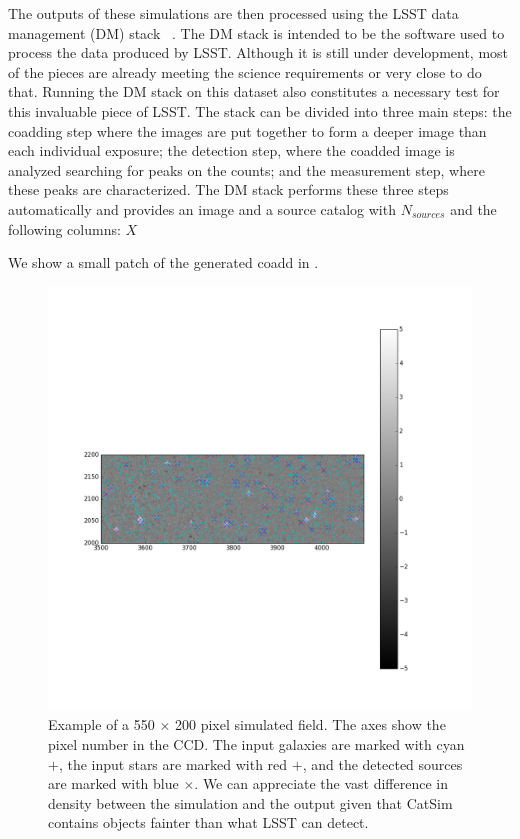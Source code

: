 \documentclass[\docopts]{\docclass}
\begin{document}
The outputs of these simulations are then processed using the LSST data management (DM) stack~\citep{Overview,ScienceBook,WhitePaper}  . The DM stack is intended to be the software used to process the data produced by LSST. Although it is still under development, most of the pieces are already meeting the science requirements or very close to do that. Running the DM stack on this dataset also constitutes a necessary test for this invaluable piece of LSST. The stack can be divided into three main steps: the coadding step where the images are put together to form a deeper image than each individual exposure; the detection step, where the coadded image is analyzed searching for peaks on the counts; and the measurement step, where these peaks are characterized. The DM stack performs these three steps automatically and provides an image and a source catalog with $N_{sources}$ and the following columns: $X$  

We show a small patch of the generated coadd in .

\begin{figure}
\centering
\includegraphics[width=0.9\columnwidth]{field.png}
\caption{Example of a 550 $\times$ 200 pixel simulated field. The axes show the pixel number in the CCD. The input galaxies are marked with cyan $+$, the input stars are marked with red $+$, and the detected sources are marked with blue $\times$. We can appreciate the vast difference in density between the simulation and the output given that CatSim contains objects fainter than what LSST can detect.}
\label{fig:coadd_example}
\end{figure}
\end{document}
